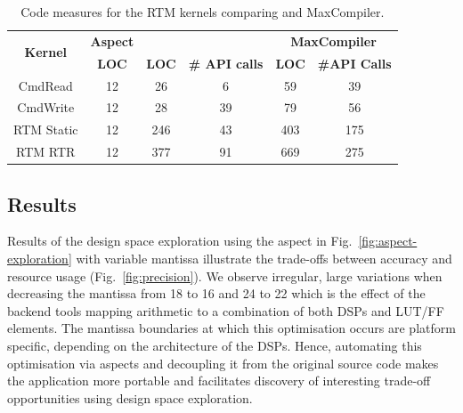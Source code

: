 \begin{table}[!h]
  \renewcommand{\arraystretch}{1.2}
  \centering
  \caption{Code measures for the RTM kernels comparing \FAST{} and
    MaxCompiler.}
  \label{table:loc}
  \begin{tabular}{c|ccc|cc}
    \hline
    \multirow{2}{*}{\bf{Kernel}} & \bf{Aspect } & \multicolumn{2}{c|}{\bf{\FAST{}}} & \multicolumn{2}{c}{\bf{MaxCompiler}}                   \\
    \                            & \bf{LOC}     & \bf{LOC}                       & \bf{\# API calls} & \bf{LOC} & \bf{\#API Calls} \\
    \hline \hline
    CmdRead                      & 12           & 26                             &      6         & 59       &      39        \\
    CmdWrite                     & 12           & 28                             &      39        & 79      &       56         \\
    RTM Static                   & 12           & 246                            &     43         & 403     &       175        \\
    RTM RTR                      & 12           & 377                            &     91         & 669     &       275       \\
  \end{tabular}
\end{table}

\subsection{Results}

Results of the design space exploration using the aspect in
Fig.~\ref{fig:aspect-exploration} with variable mantissa illustrate
the trade-offs between accuracy and resource usage
(Fig.~\ref{fig:precision}). We observe irregular, large variations
when decreasing the mantissa from 18 to 16 and 24 to 22 which is the
effect of the backend tools mapping arithmetic to a combination of
both DSPs and LUT/FF elements. The mantissa boundaries at which this
optimisation occurs are platform specific, depending on the
architecture of the DSPs. Hence, automating this optimisation via
aspects and decoupling it from the original source code makes the
application more portable and facilitates discovery of interesting
trade-off opportunities using design space exploration.


